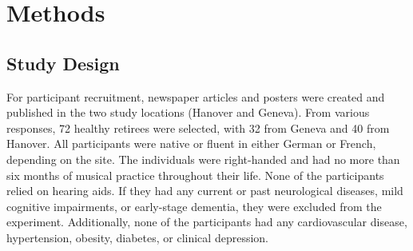 \chapter{Methods}
\label{cap:Methodology}

\section{Study Design}
For participant recruitment, newspaper articles and posters were created and published in the two study locations (Hanover and Geneva). From various responses, 72 healthy retirees were selected, with 32 from Geneva and 40 from Hanover. All participants were native or fluent in either German or French, depending on the site. The individuals were right-handed and had no more than six months of musical practice throughout their life. None of the participants relied on hearing aids. If they had any current or past neurological diseases, mild cognitive impairments, or early-stage dementia, they were excluded from the experiment. Additionally, none of the participants had any cardiovascular disease, hypertension, obesity, diabetes, or clinical depression.

